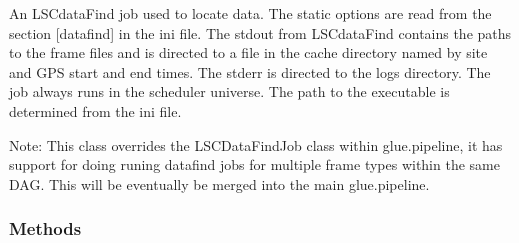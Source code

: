 An LSCdataFind job used to locate data. The static options are read from 
the section [datafind] in the ini file. The stdout from LSCdataFind 
contains the paths to the frame files and is directed to a file in the 
cache directory named by site and GPS start and end times. The stderr is 
directed to the logs directory. The job always runs in the scheduler 
universe. The path to the executable is determined from the ini file.

Note: This class overrides the LSCDataFindJob class within glue.pipeline, 
it has support for doing runing datafind jobs for multiple frame types 
within the same DAG. This will be eventually be merged into the main 
glue.pipeline.



  \subsubsection{Methods}

    \label{stochastic:LSCDataFindJob:__init__}
    \vspace{0.5ex}

